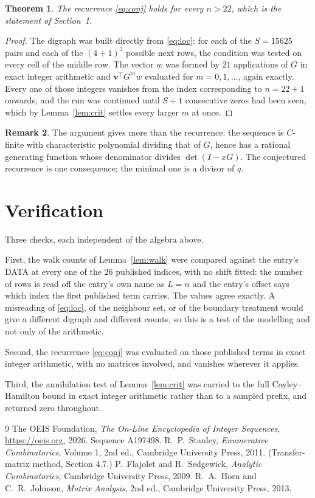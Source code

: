 \documentclass[11pt,a4paper]{article}
\theoremstyle{plain}
\newtheorem{theorem}{Theorem}
\theoremstyle{definition}
\newtheorem{remark}[theorem]{Remark}
\begin{document}
\begin{theorem}
The recurrence \eqref{eq:conj} holds for every $n>22$, which is the statement of
Section~1.
\end{theorem}

\begin{proof}
The digraph was built directly from \eqref{eq:loc}: for each of the $S=15625$ pairs and each
of the $(4+1)^{3}$ possible next rows, the condition was tested on every cell of
the middle row. The vector $w$ was formed by $21$ applications of $G$ in exact integer
arithmetic and $\mathbf{v}^{\!\top}G^{m}w$ evaluated for $m=0,1,\dots$, again exactly.
Every one of those integers vanishes from the index corresponding to $n=22+1$ onwards,
and the run was continued until $S+1$ consecutive zeros had been seen, which by
Lemma~\ref{lem:crit} settles every larger $m$ at once.
\end{proof}

\begin{remark}
The argument gives more than the recurrence: the sequence is $C$-finite with characteristic
polynomial dividing that of $G$, hence has a rational generating function whose denominator
divides $\det(I-xG)$. The conjectured recurrence is one consequence; the minimal one is a
divisor of $q$.
\end{remark}

\section{Verification}

Three checks, each independent of the algebra above.

First, the walk counts of Lemma~\ref{lem:walk} were compared against the entry's DATA at
every one of the $26$ published indices, with no shift fitted: the number of rows is
read off the entry's own name as $L=n$ and the entry's offset says which index the first
published term carries. The values agree exactly. A misreading of \eqref{eq:loc}, of the
neighbour set, or of the boundary treatment would give a different digraph and different
counts, so this is a test of the modelling and not only of the arithmetic.

Second, the recurrence \eqref{eq:conj} was evaluated on those published terms in exact
integer arithmetic, with no matrices involved, and vanishes wherever it applies.

Third, the annihilation test of Lemma~\ref{lem:crit} was carried to the full
Cayley--Hamilton bound in exact integer arithmetic rather than to a sampled prefix, and
returned zero throughout.

\begin{thebibliography}{9}
 The OEIS Foundation, \emph{The On-Line Encyclopedia of Integer
Sequences}, \url{https://oeis.org}, 2026. Sequence A197498.
 R.~P.~Stanley, \emph{Enumerative Combinatorics}, Volume 1, 2nd ed.,
Cambridge University Press, 2011. (Transfer-matrix method, Section 4.7.)
 P.~Flajolet and R.~Sedgewick, \emph{Analytic Combinatorics}, Cambridge
University Press, 2009.
 R.~A.~Horn and C.~R.~Johnson, \emph{Matrix Analysis}, 2nd ed., Cambridge
University Press, 2013.
\end{thebibliography}
\end{document}
